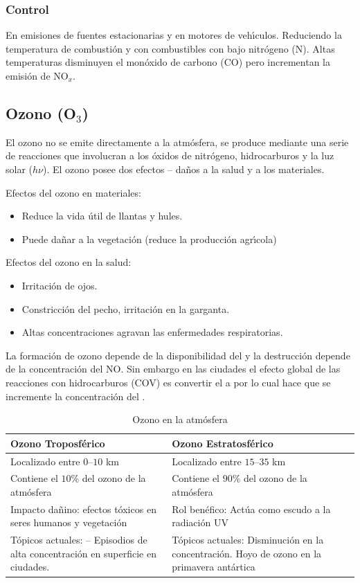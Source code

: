 \subsubsection{Control} En emisiones de fuentes estacionarias y en motores de veh\'{\i}culos. Reduciendo la temperatura de combusti\'on y con combustibles con bajo nitr\'ogeno (N). Altas temperaturas disminuyen el mon\'oxido de carbono (CO) pero incrementan la emisi\'on de  NO$_x$.

\subsection{Ozono (O$_3$)}\label{o3_salud}
El ozono no se emite directamente a la atm\'osfera, se produce mediante una serie de reacciones que involucran a los \'oxidos de nitr\'ogeno, hidrocarburos y la luz solar ($h\nu$). El ozono posee dos efectos -- da\~nos a la salud y a los materiales.

Efectos del ozono en materiales:
\begin{itemize}
\item Reduce la vida \'util de llantas y hules.
\item Puede da\~nar a la vegetaci\'on (reduce la producci\'on agr\'{\i}cola)
\end{itemize}
Efectos del ozono en la salud:
\begin{itemize}
\item Irritaci\'on de ojos.
\item Constricci\'on del pecho, irritaci\'on en la garganta.
\item Altas concentraciones agravan las enfermedades respiratorias.
\end{itemize}
La  formaci\'on de ozono depende de la disponibilidad del   y la destrucci\'on depende de la concentraci\'on del NO. Sin embargo en las ciudades el efecto global de las reacciones con hidrocarburos (COV) es convertir el  a  por lo cual hace que se incremente la concentraci\'on del .

\begin{table}[hbt]
\caption{Ozono en la atm\'osfera}
\label{ozon:1}
\begin{center}
{\footnotesize \begin{tabularx}{.9\textwidth}{X|X}
\textbf{Ozono Troposf\'erico}&\textbf{Ozono Estratosf\'erico}\\ \hline \hline
Localizado entre $0$--$10$ \si{\kilo\metre}& Localizado entre $15$--$35$ \si{\kilo\metre}\\
Contiene el $10$\% del ozono de la atm\'osfera&
Contiene el $90$\% del ozono de la atm\'osfera\\
Impacto da\~nino: efectos t\'oxicos en seres humanos y vegetaci\'on&
Rol ben\'efico: Act\'ua como escudo a la radiaci\'on UV\\
T\'opicos actuales: -- Episodios de alta concentraci\'on en superficie en ciudades.&
T\'opicos actuales: Disminuci\'on en la concentraci\'on. Hoyo de ozono en la
primavera ant\'artica\\\hline
\end{tabularx}}
\end{center}
\end{table}

